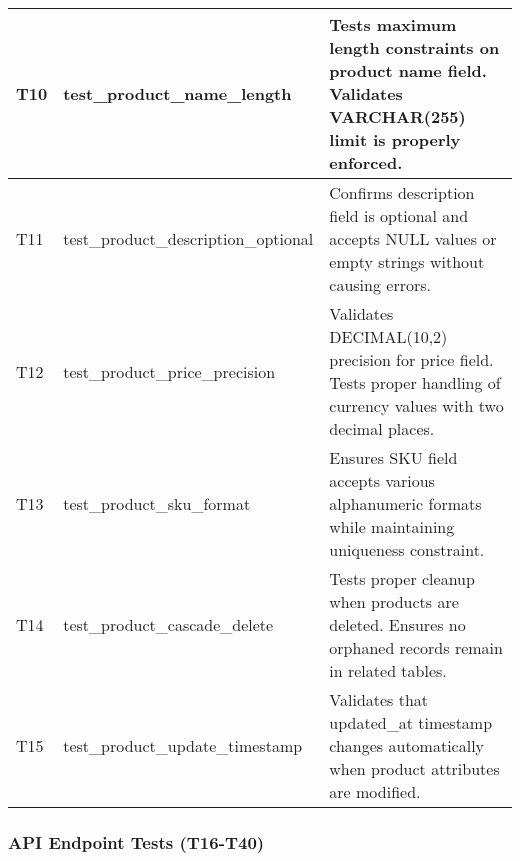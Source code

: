 \documentclass[12pt,a4paper]{article}
\begin{document}
\begin{longtable}{|p{1cm}|p{5cm}|p{8.5cm}|}
T10 & test\_product\_name\_length & Tests maximum length constraints on product name field. Validates VARCHAR(255) limit is properly enforced. \\
\hline

T11 & test\_product\_description\_optional & Confirms description field is optional and accepts NULL values or empty strings without causing errors. \\
\hline

T12 & test\_product\_price\_precision & Validates DECIMAL(10,2) precision for price field. Tests proper handling of currency values with two decimal places. \\
\hline

T13 & test\_product\_sku\_format & Ensures SKU field accepts various alphanumeric formats while maintaining uniqueness constraint. \\
\hline

T14 & test\_product\_cascade\_delete & Tests proper cleanup when products are deleted. Ensures no orphaned records remain in related tables. \\
\hline

T15 & test\_product\_update\_timestamp & Validates that updated\_at timestamp changes automatically when product attributes are modified. \\
\hline

\end{longtable}

\subsubsection{API Endpoint Tests (T16-T40)}
\end{document}
